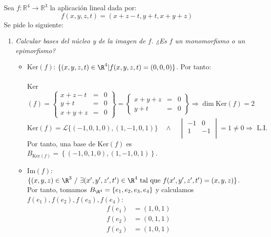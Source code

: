 \begin{ejercicio}
	Sea \( f : \mathbb{R}^4 \rightarrow \mathbb{R}^3 \) la aplicación lineal dada por:
	\[ f(x,y,z,t) = (x+z-t, y+t,x+y+z) \]
	Se pide lo siguiente:
	\begin{enumerate}
		\item \textit{Calcular bases del núcleo y de la imagen de \( f \). ¿Es \( f \) un monomorfismo o un epimorfismo?}
		      \begin{itemize}
			      \item Ker$(f)$: $\{(x,y,z,t) \in \R^4 | f(x,y,z,t) = (0,0,0)\}$. Por tanto:
			            \\ \\
			            Ker$(f)=\left\{\begin{array}{rcl}
					            x+z-t & = & 0 \\
					            y+t   & = & 0 \\
					            x+y+z & = & 0
				            \end{array} \right\}  =
				            \left\{\begin{array}{rcl}
					            x+y+z & = & 0 \\
					            y+t   & = & 0
				            \end{array} \right\} \Rightarrow \dim{\text{Ker}(f)}=2$
			            \begin{equation*}
				            \text{Ker}(f) = \mathcal{L}\{(-1,0,1,0),(1,-1,0,1)\} \quad \land \quad
				            \begin{vmatrix}
					            -1 & 0  \\
					            1  & -1 \\
				            \end{vmatrix} = 1 \neq 0 \Rightarrow \text{  L.I.}
			            \end{equation*}
			            Por tanto, una base de Ker$(f)$ es $B_{\text{Ker}(f)}=\left\{(-1,0,1,0),(1,-1,0,1)\right\}$. \\
			      \item Im$(f)$: $\{(x,y,z) \in \R^3  \ / \ \exists (x',y',z',t') \in \R^4 \text{ tal que } f(x',y',z',t') = (x,y,z)\}$. Por tanto, tomamos
			            $B_{\R^4} = \{e_1 , e_2 , e_3 , e_4 \}$ y calculamos $f(e_1),f(e_2),f(e_3),f(e_4)$:
			            \begin{align*}
				            f(e_1) & = (1,0,1)  \\
				            f(e_2) & = (0,1,1)  \\
				            f(e_3) & = (1,0,1)  \\

\end{align*}
\end{itemize}
\end{enumerate}
\end{ejercicio}

